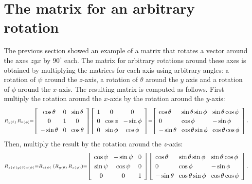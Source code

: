 \documentclass[11pt,a4paper]{report}
\newcommand*{\spacearray}{
\renewcommand{\arraystretch}{1.2}
\setlength{\arraycolsep}{4pt}
}
\begin{document}

\section{The matrix for an arbitrary rotation}

The previous section showed an example of a matrix that rotates a vector around the axes $zyx$ by $90^\circ$ each. The matrix for arbitrary rotations around these axes is obtained by multiplying the matrices for each axis using arbitrary angles: a rotation of $\psi$ around the $z$-axis, a rotation of $\theta$ around the $y$ axis and a rotation of $\phi$ around the $x$-axis. The resulting matrix is computed as follows. First multiply the rotation around the $x$-axis by the rotation around the $y$-axis:
\[
\spacearray
\begin{scriptstyle}
R_{y(\theta)} \, R_{x(\phi)} =
\left[
\begin{array}{ccc}
\cos\theta & 0 & \sin\theta\\
0 & 1 & 0\\
-\sin\theta &0& \cos\theta\\
\end{array}
\right]
\left[
\begin{array}{ccc}
1&0&0\\
0&\cos\phi & -\sin\phi\\
0&\sin\phi & \cos\phi\\
\end{array}
\right]
=
\left[
\begin{array}{lll}
\cos\theta  &  \sin\theta\sin\phi & \sin\theta\cos\phi \\
0& \cos\phi & -\sin\phi\\
-\sin\theta & \cos\theta\sin\phi &  \cos\theta\cos\phi\\
\end{array}
\right]\,.
\end{scriptstyle}
\]
Then, multiply the result by the rotation around the $z$-axis:
\[
\spacearray
\begin{scriptstyle}
R_{z(\psi)y(\theta)x(\phi)}=R_{z(\psi)}\,(R_{y(\theta)} \, R_{x(\phi)}) =
\left[
\begin{array}{ccc}
\cos\psi & -\sin\psi &0\\
\sin\psi & \cos\psi &0\\
0&0&1\\
\end{array}
\right]
\left[
\begin{array}{lll}
\cos\theta  &  \sin\theta\sin\phi & \sin\theta\cos\phi \\
0& \cos\phi & -\sin\phi\\
-\sin\theta & \cos\theta\sin\phi &  \cos\theta\cos\phi\\
\end{array}
\right]\,.
\end{scriptstyle}
\]
\end{document}
